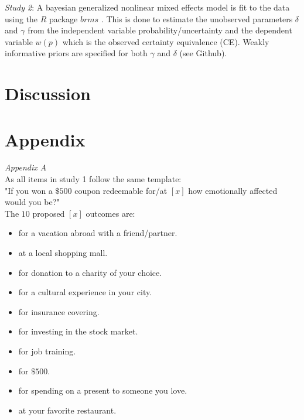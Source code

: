 \documentclass[12pt]{article}
\begin{document}
\emph{Study 2}: A bayesian generalized nonlinear
mixed effects model is fit to the data using the
$R$ package $brms$ \autocite{brms}.
This is done to estimate the unobserved parameters
$\delta$ and $\gamma$ from the independent variable
probability/uncertainty and the dependent variable
$w(p)$ which is the observed certainty equivalence (CE).
Weakly informative priors are specified for both
$\gamma$ and $\delta$ (see Github).


\section{Discussion}

\printbibliography

\section{Appendix}

\emph{Appendix A} \\
As all items in study 1 follow the same template: \\

"If you won a $\$500$ coupon redeemable for/at
$[x]$ how emotionally affected would you be?" \\

The $10$ proposed $[x]$ outcomes are:
\begin{itemize}
	\item for a vacation abroad with a friend/partner.
	\item at a local shopping mall.
	\item for donation to a charity of your choice.
	\item for a cultural experience in your city.
	\item for insurance covering.
	\item for investing in the stock market.
	\item for job training.
	\item for $\$500$.
	\item for spending on a present to someone you love.
	\item at your favorite restaurant.
\end{itemize}
\end{document}
